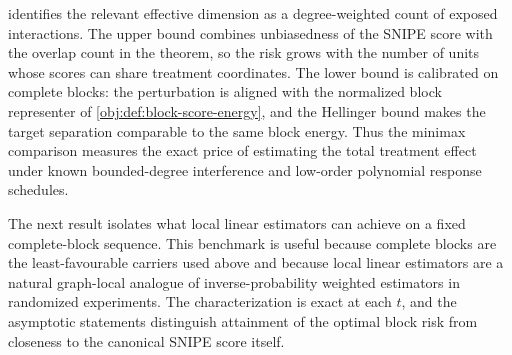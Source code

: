  identifies the relevant effective dimension as a degree-weighted count of exposed interactions. The upper bound combines unbiasedness of the SNIPE score with the overlap count in the theorem, so the risk grows with the number of units whose scores can share treatment coordinates. The lower bound is calibrated on complete blocks: the perturbation is aligned with the normalized block representer of \cref{obj:def:block-score-energy}, and the Hellinger bound makes the target separation comparable to the same block energy. Thus the minimax comparison measures the exact price of estimating the total treatment effect under known bounded-degree interference and low-order polynomial response schedules.

The next result isolates what local linear estimators can achieve on a fixed complete-block sequence. This benchmark is useful because complete blocks are the least-favourable carriers used above and because local linear estimators are a natural graph-local analogue of inverse-probability weighted estimators in randomized experiments. The characterization is exact at each \(t\), and the asymptotic statements distinguish attainment of the optimal block risk from closeness to the canonical SNIPE score itself.

